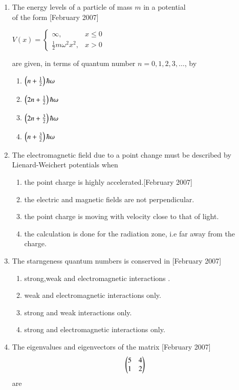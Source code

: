 \documentclass[journal]{IEEEtran}
\begin{document}
\begin{enumerate}
\item  The energy levels of a particle of mass $m$ in a potential \\of the form \hfill[February 2007]

$
V(x) = 
\begin{cases} 
\infty, & x \leq 0 \\
\frac{1}{2} m \omega^2 x^2, & x > 0
\end{cases} $

are given, in terms of quantum number $n = 0, 1, 2, 3, \dots$, by

\begin{enumerate}
\item $ \left(n + \frac{1}{2}\right)\hbar\omega  $
\item $ \left(2n + \frac{1}{2}\right)\hbar\omega  $
\item $ \left(2n + \frac{3}{2}\right)\hbar\omega  $
\item $ \left(n + \frac{3}{2}\right)\hbar\omega $
\end{enumerate}

\item The electromagnetic field due to a point change must be described by Lienard-Weichert potentials when 
\begin{enumerate}
\item  the point charge is highly accelerated.\hfill[February 2007]
\item the electric and magnetic fields are not perpendicular.
\item the point charge is moving with velocity close to that of light.
\item the calculation is done for the radiation zone, i.e far away from the charge.
\end{enumerate}
\item The starngeness quantum numbers is conserved in \hfill[February 2007]
\begin{enumerate}
\item strong,weak and electromagnetic interactions .
    \item weak and electromagnetic interactions only.
    \item strong and weak interactions only.
    \item strong and electromagnetic interactions only.
\end{enumerate}
\item The eigenvalues and eigenvectors of the matrix \hfill[February 2007]
\[
\begin{pmatrix}
5 & 4 \\
1 & 2
\end{pmatrix}
\]
are


\end{enumerate}
\end{document}
